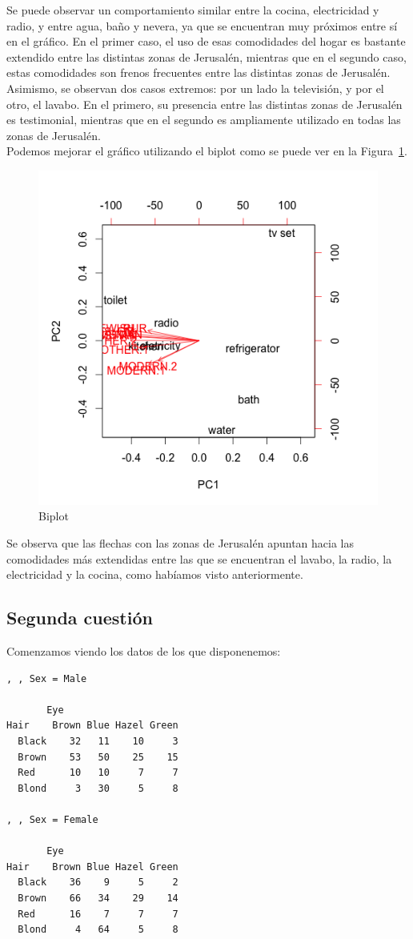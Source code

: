 \documentclass[12pt,a4paper,twoside,openright,titlepage,final]{article}
\begin{document}
Se puede observar un comportamiento similar entre la cocina, electricidad y radio, y entre agua, baño y nevera, ya que se encuentran muy próximos entre sí en el gráfico. En el primer caso, el uso de esas comodidades del hogar es bastante extendido entre las distintas zonas de Jerusalén, mientras que en el segundo caso, estas comodidades son frenos frecuentes entre las distintas zonas de Jerusalén.\\
Asimismo, se observan dos casos extremos: por un lado la televisión, y por el otro, el lavabo. En el primero, su presencia entre las distintas zonas de Jerusalén es testimonial, mientras que en el segundo es ampliamente utilizado en todas las zonas de Jerusalén.\\

Podemos mejorar el gráfico utilizando el biplot como se puede ver en la Figura~\ref{fig:biplot}.\\

\begin{figure}[tbph!]
\centering
\includegraphics[width=0.5\linewidth]{imagenes/biplot}
\caption{Biplot}
\label{fig:biplot}
\end{figure}

Se observa que las flechas con las zonas de Jerusalén apuntan hacia las comodidades más extendidas entre las que se encuentran el lavabo, la radio, la electricidad y la cocina, como habíamos visto anteriormente.\\

\subsection{Segunda cuestión}

Comenzamos viendo los datos de los que disponenemos:

\begin{verbatim}
, , Sex = Male

       Eye
Hair    Brown Blue Hazel Green
  Black    32   11    10     3
  Brown    53   50    25    15
  Red      10   10     7     7
  Blond     3   30     5     8

, , Sex = Female

       Eye
Hair    Brown Blue Hazel Green
  Black    36    9     5     2
  Brown    66   34    29    14
  Red      16    7     7     7
  Blond     4   64     5     8

\end{verbatim}
\end{document}
